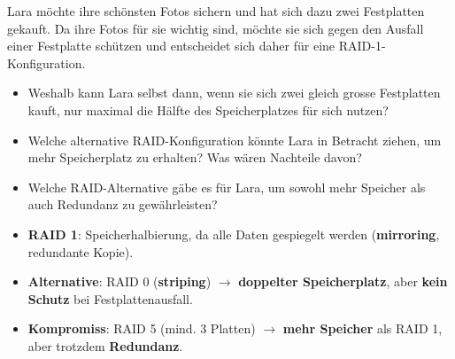 \begin{myexercise}
    Lara möchte ihre schönsten Fotos sichern und hat sich dazu zwei Festplatten gekauft. Da ihre Fotos für sie wichtig sind, möchte sie sich gegen den Ausfall einer Festplatte schützen und entscheidet sich daher für eine RAID-1-Konfiguration.

    \begin{itemize}
        \item Weshalb kann Lara selbst dann, wenn sie sich zwei gleich grosse Festplatten kauft, nur maximal die Hälfte des Speicherplatzes für sich nutzen?
        \item Welche alternative RAID-Konfiguration könnte Lara in Betracht ziehen, um mehr Speicherplatz zu erhalten? Was wären Nachteile davon?
        \item Welche RAID-Alternative gäbe es für Lara, um sowohl mehr Speicher als auch Redundanz zu gewährleisten?
    \end{itemize}


    \begin{myanswer}
        \begin{itemize}
            \item \textbf{RAID 1}: Speicherhalbierung, da alle Daten gespiegelt werden (\textbf{mirroring}, redundante Kopie).
            \item \textbf{Alternative}: RAID 0 (\textbf{striping}) $\rightarrow$ \textbf{doppelter Speicherplatz}, aber \textbf{kein Schutz} bei Festplattenausfall.
            \item \textbf{Kompromiss}: RAID 5 (mind. 3 Platten) $\rightarrow$ \textbf{mehr Speicher} als RAID 1, aber trotzdem \textbf{Redundanz}.
        \end{itemize}
    \end{myanswer}
\end{myexercise}

